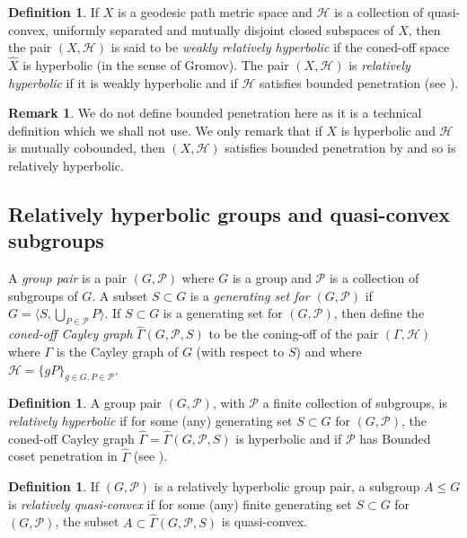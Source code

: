 \documentclass[11pt, a4paper]{amsart}
\theoremstyle{definition}
\newtheorem{definition}[theorem]{Definition}
\newtheorem{remark}[theorem]{Remark}
\newcommand{\wh}[1]{\widehat{ #1 }}
\begin{document}
\begin{definition}
If $X$ is a geodesic path metric space and $\mathcal{H}$ is a collection of quasi-convex, uniformly separated and mutually disjoint closed subspaces of $X$, then the pair $(X, \mathcal{H})$ is said to be \emph{weakly relatively hyperbolic} if the coned-off space $\widehat{X}$ is hyperbolic (in the sense of Gromov). The pair $(X, \mathcal{H})$ is \emph{relatively hyperbolic} if it is weakly hyperbolic and if $\mathcal{H}$ satisfies bounded penetration (see \cite[Definition 2.8]{MR08}).
\end{definition}

\begin{remark}
\label{rem:mutually_cobounded}
We do not define bounded penetration here as it is a technical definition which we shall not use. We only remark that if $X$ is hyperbolic and $\mathcal{H}$ is mutually cobounded, then $(X, \mathcal{H})$ satisfies bounded penetration by \cite[Lemma 2.7]{MR08} and so is relatively hyperbolic.
\end{remark}


\subsection{Relatively hyperbolic groups and quasi-convex subgroups}
\label{sec:rel_hyp}

A \emph{group pair} is a pair $(G, \mathcal{P})$ where $G$ is a group and $\mathcal{P}$ is a collection of subgroups of $G$. A subset $S\subset G$ is a \emph{generating set for $(G, \mathcal{P})$} if $G = \langle S, \bigcup_{P\in \mathcal{P}}P\rangle$. If $S\subset G$ is a generating set for $(G, \mathcal{P})$, then define the \emph{coned-off Cayley graph} $\wh{\Gamma}(G, \mathcal{P}, S)$ to be the coning-off of the pair $(\Gamma, \mathcal{H})$ where $\Gamma$ is the Cayley graph of $G$ (with respect to $S$) and where $\mathcal{H} = \{gP\}_{g\in G, P\in\mathcal{P}}$.

\begin{definition}
\label{def:rel_hyp}
A group pair $(G, \mathcal{P})$, with $\mathcal{P}$ a finite collection of subgroups, is \emph{relatively hyperbolic} if for some (any) generating set $S\subset G$ for $(G, \mathcal{P})$, the coned-off Cayley graph $\wh{\Gamma} = \wh{\Gamma}(G, \mathcal{P}, S)$ is hyperbolic and if $\mathcal{P}$ has Bounded coset penetration in $\hat{\Gamma}$ (see \cite[Definition 3.6]{Hr10}).
\end{definition}

\begin{definition}
If $(G, \mathcal{P})$ is a relatively hyperbolic group pair, a subgroup $A\leqslant G$ is \emph{relatively quasi-convex} if for some (any) finite generating set $S\subset G$ for $(G, \mathcal{P})$, the subset $A\subset \wh{\Gamma}(G, \mathcal{P}, S)$ is quasi-convex.
\end{definition}
\end{document}
